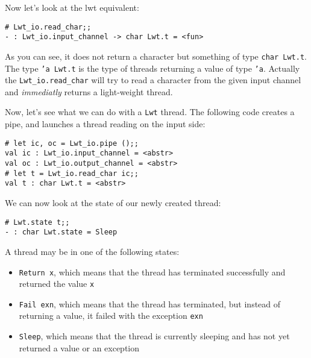 Now let's look at the lwt equivalent:



\lstset{language=[Objective]Caml}\begin{lstlisting}
# Lwt_io.read_char;;
- : Lwt_io.input_channel -> char Lwt.t = <fun>
\end{lstlisting}
\medskip

\noindent
As you can see, it does not return a character but something of
type {\tt char Lwt.t}. The type {\tt 'a Lwt.t} is the type
of threads returning a value of type {\tt 'a}. Actually the
{\tt Lwt\_io.read\_char} will try to read a character from the
given input channel and \emph{immediatly} returns a light-weight
thread.



Now, let's see what we can do with a {\tt Lwt} thread. The following
code creates a pipe, and launches a thread reading on the input side:



\lstset{language=[Objective]Caml}\begin{lstlisting}
# let ic, oc = Lwt_io.pipe ();;
val ic : Lwt_io.input_channel = <abstr>
val oc : Lwt_io.output_channel = <abstr>
# let t = Lwt_io.read_char ic;;
val t : char Lwt.t = <abstr>
\end{lstlisting}
\medskip

\noindent
We can now look at the state of our newly created thread:



\lstset{language=[Objective]Caml}\begin{lstlisting}
# Lwt.state t;;
- : char Lwt.state = Sleep
\end{lstlisting}
\medskip

\noindent
A thread may be in one of the following states:



\begin{itemize}
\item  {\tt Return x}, which means that the thread has terminated
successfully and returned the value {\tt x}
\item  {\tt Fail exn}, which means that the thread has terminated,
but instead of returning a value, it failed with the exception
{\tt exn}
\item  {\tt Sleep}, which means that the thread is currently
sleeping and has not yet returned a value or an exception

\end{itemize}

